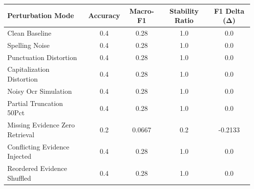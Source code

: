 \begin{tabular}{lcccc}
\hline
Perturbation Mode & Accuracy & Macro-F1 & Stability Ratio & F1 Delta (Δ) \\
\hline
Clean Baseline & 0.4 & 0.28 & 1.0 & 0.0 \\
Spelling Noise & 0.4 & 0.28 & 1.0 & 0.0 \\
Punctuation Distortion & 0.4 & 0.28 & 1.0 & 0.0 \\
Capitalization Distortion & 0.4 & 0.28 & 1.0 & 0.0 \\
Noisy Ocr Simulation & 0.4 & 0.28 & 1.0 & 0.0 \\
Partial Truncation 50Pct & 0.4 & 0.28 & 1.0 & 0.0 \\
Missing Evidence Zero Retrieval & 0.2 & 0.0667 & 0.2 & -0.2133 \\
Conflicting Evidence Injected & 0.4 & 0.28 & 1.0 & 0.0 \\
Reordered Evidence Shuffled & 0.4 & 0.28 & 1.0 & 0.0 \\
\hline
\end{tabular}
